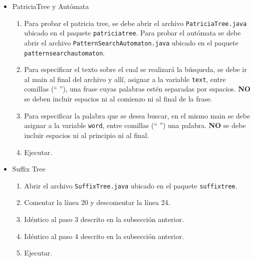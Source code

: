 \documentclass[14pt,letterpaper,hidelinks]{extarticle}
\begin{document}
	\begin{itemize}
		\item PatriciaTree y Autómata
		\begin{enumerate}
			\item Para probar el patricia tree, se debe abrir el archivo 			\verb+PatriciaTree.java+ ubicado en el paquete 									\verb+patriciatree+. Para probar el autómata se debe abrir el archivo \verb+PatternSearchAutomaton.java+ ubicado en el paquete \verb+patternsearchautomaton+.

			\item Para especificar el texto sobre el cual se realizará la búsqueda, se debe ir al main al final del archivo y allí, asignar a la variable \verb+text+, entre comillas (`` ''), una frase cuyas palabras estén separadas por espacios. \textbf{NO} se deben incluir espacios ni al comienzo ni al final de la frase.

			\item Para especificar la palabra que se desea buscar, en el mismo main se debe asignar a la variable \verb+word+, entre comillas (`` '') una palabra. \textbf{NO} se debe incluir espacios ni al principio ni al final.
			\item Ejecutar.
		\end{enumerate}

		\item Suffix Tree
			\begin{enumerate}
				\item Abrir el archivo \verb+SuffixTree.java+ ubicado en el paquete \verb+suffixtree+.

				\item Comentar la línea 20 y descomentar la línea 24.

				\item Idéntico al paso 3 descrito en la subsección anterior.

				\item Idéntico al paso 4 descrito en la subsección anterior.
				
				\item Ejecutar.
			\end{enumerate}
\end{itemize}
\newpage
\end{document}
